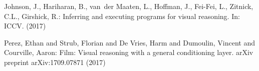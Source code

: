 \documentclass[runningheads]{llncs}
\begin{document}
\begin{thebibliography}{8}
Johnson, J., Hariharan, B., van~der Maaten, L., Hoffman, J., Fei-Fei, L.,
  Zitnick, C.L., Girshick, R.:
\newblock Inferring and executing programs for visual reasoning.
\newblock In: ICCV. (2017)

Perez, Ethan and Strub, Florian and De Vries, Harm and Dumoulin, Vincent and Courville, Aaron:
\newblock Film: Visual reasoning with a general conditioning layer.
\newblock arXiv preprint arXiv:1709.07871 (2017)




\end{thebibliography}
\end{document}
